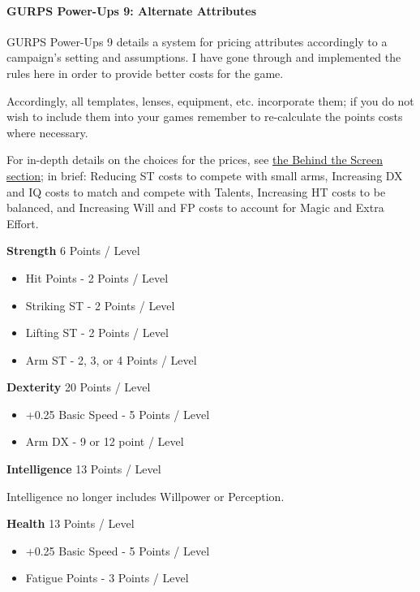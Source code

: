 \begin{multicols*}{3}
	\paragraph{GURPS Power-Ups 9: Alternate Attributes \label{PU9}}
	GURPS Power-Ups 9 details a system for pricing attributes accordingly to a campaign's setting and assumptions. I have gone through and implemented the rules here in order to provide better costs for the game. 
	
	Accordingly, all templates, lenses, equipment, etc. incorporate them; if you do not wish to include them into your games remember to re-calculate the points costs where necessary.
	
	For in-depth details on the choices for the prices, see \hyperref[behind_the_screen]{the Behind the Screen section}; in brief: Reducing ST costs to compete with small arms, Increasing DX and IQ costs to match and compete with Talents, Increasing HT costs to be balanced, and Increasing Will and FP costs to account for Magic and Extra Effort.
	
	\noindent\textbf{Strength}
	6 Points / Level
	
	\begin{itemize}
		\itemsep0em 
		\item Hit Points - 2 Points / Level
		\item Striking ST - 2 Points / Level
		\item Lifting ST - 2 Points / Level
		\item Arm ST - 2, 3, or 4 Points / Level
	\end{itemize}
	
	\noindent\textbf{Dexterity}
	20 Points / Level
	
	\begin{itemize}
		\itemsep0em 
		\item +0.25 Basic Speed - 5 Points / Level
		\item Arm DX - 9 or 12 point / Level
	\end{itemize}
	
	\noindent\textbf{Intelligence}
	13 Points / Level
	
	\noindent
	Intelligence no longer includes Willpower or Perception.
	
	\noindent\newline\textbf{Health}
	13 Points / Level
	
	\begin{itemize}
		\itemsep 0pt
		\item +0.25 Basic Speed - 5 Points / Level
		\item Fatigue Points - 3 Points / Level
	\end{itemize}
	

\end{multicols*}
